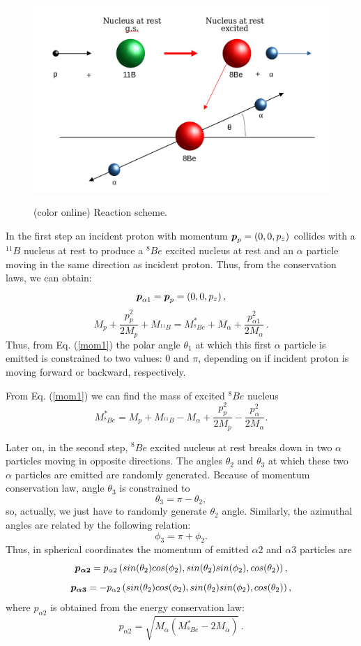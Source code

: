 \documentclass[aps,prc,twocolumn,floatfix,showpacs,a4paper,
nofootinbib,amsmath,amssymb]{revtex4}
\newcommand{\be}{\begin{equation}}
\newcommand{\ee}{\end{equation}}
\renewcommand{\vec}[1]{\mbox{\boldmath$#1$}}
\begin{document}
\begin{figure}[h]
	\begin{center}
		\resizebox{0.98\columnwidth}{!}
		{\includegraphics{reaction_scheme.png}}
		\caption{ (color online)
			Reaction scheme.
		}
		\label{Reaction}
	\end{center}
\end{figure} 

In the first step an incident proton with momentum $\vec p_p=(0,0,p_z)$ collides with a $ ^{11}B$ nucleus at rest to produce a $^8Be$ excited nucleus at rest and an $\alpha$ particle moving in the same direction as incident proton. Thus, from the conservation laws, we can obtain: 
\begin{equation}
	\vec p_{\alpha1} = \vec p_p=(0,0,p_z)\,,
	\label{mom1}
\end{equation}
\be
M_p + \frac{p_p^2}{2M_p} + M_{^{11}B} = M_{^8Be}^* + M_{\alpha} + \frac{p_{\alpha1}^2}{2M_{\alpha}}\,.
	\label{ener1}
\ee 
Thus, from Eq. (\ref{mom1}) the polar angle $\theta_1$ at which this first $\alpha$ particle is emitted is constrained to two values: $0$ and $\pi$, depending on if incident proton is moving forward or backward, respectively.

From Eq. (\ref{mom1}) we can find the mass of excited $^8Be$ nucleus
\be
M_{^8Be}^* = M_p + M_{^{11}B} -  M_{\alpha} + \frac{p_p^2}{2M_p}  -  \frac{p_{\alpha}^2}{2M_{\alpha}}.
\label{ex.mass}
\ee

Later on, in the second step,  $^8Be$ excited nucleus at rest breaks down in two $\alpha$ particles moving in opposite directions. The angles $\theta_2$ and $\theta_3$ at which these two $\alpha$ particles are emitted are randomly generated. Because of momentum conservation law, angle $\theta_3$ is constrained to
\be
\theta_3 = \pi - \theta_2,
\ee
so, actually, we just have to randomly generate $\theta_2$ angle. Similarly, the azimuthal angles are related by the following relation:
\be
\phi_3 = \pi + \phi_2.
\ee
Thus, in spherical coordinates the momentum of emitted $\alpha 2$ and $\alpha 3$ particles are 
\be
\vec{p_{\alpha2}} = p_{\alpha2}\left(sin(\theta_2)cos(\phi_2),sin(\theta_2)sin(\phi_2),cos(\theta_2)\right),
\ee
\be
\vec{p_{\alpha3}} = -p_{\alpha2}\left(sin(\theta_2)cos(\phi_2),sin(\theta_2)sin(\phi_2),cos(\theta_2)\right),
\ee
where $p_{\alpha 2}$ is obtained from the energy conservation law:
\be
p_{\alpha 2}=\sqrt{M_\alpha (M_{^8Be}^* - 2 M_\alpha)}\,.
\label{alpha_for_decay}
\ee
\end{document}
